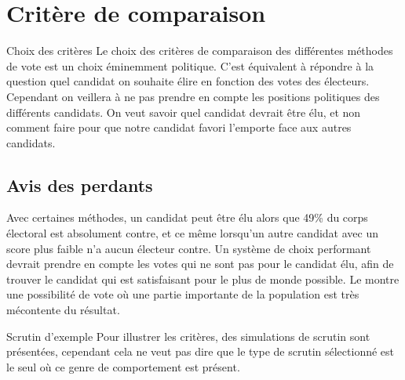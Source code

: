 \documentclass[../report]{subfiles}
\begin{document}
  
  \chapter{Critère de comparaison}
  
  \begin{important}{Choix des critères}
  	Le choix des critères de comparaison des différentes méthodes de vote est un choix 
  	éminemment politique.
  	C'est équivalent à répondre à la question quel candidat on souhaite élire en fonction
  	des votes des électeurs. Cependant on veillera à ne pas prendre en compte les positions 
  	politiques des différents candidats.
  	On veut savoir quel candidat devrait être élu, et non comment faire pour que notre candidat 
  	favori l'emporte face aux autres candidats.
  \end{important}


  \section{Avis des perdants}

  Avec certaines méthodes, un candidat peut être élu alors que 49\% du corps électoral est
  absolument contre, et ce même lorsqu'un autre candidat avec un score plus faible n'a aucun
  électeur contre.
  Un système de choix performant devrait prendre en compte les votes qui ne sont pas pour le candidat
  élu, afin de trouver le candidat qui est satisfaisant pour le plus de monde possible.
  Le  montre une possibilité de vote où une partie importante de la population 
  est très mécontente du résultat.

  \begin{nota}{Scrutin d'exemple}
	Pour illustrer les critères, des simulations de scrutin sont présentées, cependant cela ne 
	veut pas dire que le type de scrutin sélectionné est le seul où ce genre de comportement 
	est présent.
  \end{nota}

	\begin{table}[h]
		\begin{center}
			\caption{Exemple de cas où une grande partie de la population est mécontente}%
			\label{fig:critere:perdant:example}
		\end{center}
	\end{table}
  
\end{document}

